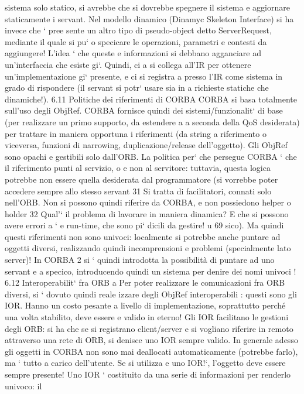 \documentclass[a4paper,12pt]{article}
\begin{document}
sistema solo statico, si avrebbe che si
dovrebbe spegnere il sistema e aggiornare staticamente i servant.
Nel modello dinamico (Dinamyc Skeleton Interface) si ha invece che ` pree
sente un altro tipo di pseudo-object detto ServerRequest, mediante il quale si pu`
o
specicare le operazioni, parametri e contesti da aggiungere! L'idea ` che queste
e
informazioni si debbano agganciare ad un'interfaccia che esiste gi`. Quindi, ci
a
si collega all'IR per ottenere un'implementazione gi` presente, e ci si registra
a
presso l'IR come sistema in grado di rispondere (il servant si potr` usare sia in
a
richieste statiche che dinamiche!).
6.11
Politiche dei riferimenti di CORBA
CORBA si basa totalmente sull'uso degli ObjRef. CORBA fornisce quindi dei
sistemi/funzionalit` di base (per realizzare un primo supporto, da estendere a
a
seconda della QoS desiderata) per trattare in maniera opportuna i riferimenti
(da string a riferimento o viceversa, funzioni di narrowing, duplicazione/release
dell'oggetto). Gli ObjRef sono opachi e gestibili solo dall'ORB.
La politica per` che persegue CORBA ` che il riferimento punti al servizio,
o
e
non al servitore: tuttavia, questa logica potrebbe non essere quella desiderata dal programmatore (si vorrebbe poter
accedere sempre allo stesso servant
31 Si tratta di facilitatori, connati solo nell'ORB. Non si possono quindi riferire da CORBA,
e non possiedono helper o holder
32 Qual'` il problema di lavorare in maniera dinamica? E che si possono avere errori a
`
e
run-time, che sono pi` dicili da gestire!
u
69
sico). Ma quindi questi riferimenti non sono univoci: localmente si potrebbe
anche puntare ad oggetti diversi, realizzando quindi incomprensioni e problemi
(specialmente lato server)!
In CORBA 2 si ` quindi introdotta la possibilità di puntare ad uno servant
e
a
specico, introducendo quindi un sistema per denire dei nomi univoci !
6.12
Interoperabilit` fra ORB
a
Per poter realizzare le comunicazioni fra ORB diversi, si ` dovuto quindi reale
izzare degli ObjRef interoperabili : questi sono gli IOR. Hanno un costo pesante
a livello di implementazione, soprattutto perché una volta stabilito, deve essere
e
valido in eterno!
Gli IOR facilitano le gestioni degli ORB: si ha che se si registrano client/server
e si vogliano riferire in remoto attraverso una rete di ORB, si denisce uno IOR
sempre valido. In generale adesso gli oggetti in CORBA non sono mai deallocati
automaticamente (potrebbe farlo), ma ` tutto a carico dell'utente. Se si utilizza
e
uno IOR!`, l'oggetto deve essere sempre presente!
Uno IOR ` costituito da una serie di informazioni per renderlo univoco: il
\end{document}
